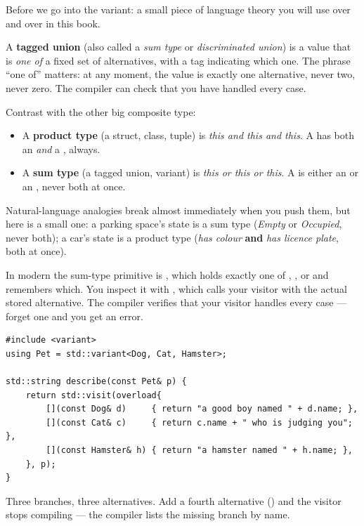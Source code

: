 Before we go into the variant: a small piece of language theory you
will use over and over in this book.

A \textbf{tagged union} (also called a \emph{sum type} or
\emph{discriminated union}) is a value that is \emph{one of} a fixed
set of alternatives, with a tag indicating which one. The phrase
``one of'' matters: at any moment, the value is exactly one
alternative, never two, never zero. The compiler can check that you
have handled every case.

Contrast with the other big composite type:

\begin{itemize}[leftmargin=*]
  \item A \textbf{product type} (a struct, class, tuple) is
    \emph{this and this and this}. A 
    has both an  \emph{and} a , always.
  \item A \textbf{sum type} (a tagged union, variant) is
    \emph{this or this or this}. A  is either an
     or an , never both at once.
\end{itemize}

Natural-language analogies break almost immediately when you push
them, but here is a small one: a parking space's state is a sum
type (\emph{Empty} or \emph{Occupied}, never both); a car's state
is a product type (\emph{has colour} \textbf{and} \emph{has
licence plate}, both at once).

In modern \cpp{} the sum-type primitive is , which holds exactly one of , , or  and
remembers which. You inspect it with , which calls
your visitor with the actual stored alternative. The compiler
verifies that your visitor handles every case --- forget one and
you get an error.

\begin{lstlisting}
#include <variant>
using Pet = std::variant<Dog, Cat, Hamster>;

std::string describe(const Pet& p) {
    return std::visit(overload{
        [](const Dog& d)     { return "a good boy named " + d.name; },
        [](const Cat& c)     { return c.name + " who is judging you"; },
        [](const Hamster& h) { return "a hamster named " + h.name; },
    }, p);
}
\end{lstlisting}

Three branches, three alternatives. Add a fourth alternative
() and the visitor stops compiling --- the compiler
lists the missing branch by name.

